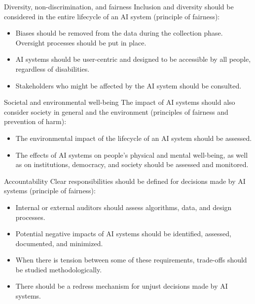 \begin{descriptionlist}
    \item[Diversity, non-discrimination, and fairness] 
        Inclusion and diversity should be considered in the entire lifecycle of an AI system (principle of fairness):
        \begin{itemize}
            \item Biases should be removed from the data during the collection phase. Oversight processes should be put in place.
            \item AI systems should be user-centric and designed to be accessible by all people, regardless of disabilities.
            \item Stakeholders who might be affected by the AI system should be consulted.
        \end{itemize}



    \item[Societal and environmental well-being] 
        The impact of AI systems should also consider society in general and the environment (principles of fairness and prevention of harm):
        \begin{itemize}
            \item The environmental impact of the lifecycle of an AI system should be assessed.
            \item The effects of AI systems on people's physical and mental well-being, as well as on institutions, democracy, and society should be assessed and monitored.
        \end{itemize}

    \item[Accountability] 
        Clear responsibilities should be defined for decisions made by AI systems (principle of fairness):
        \begin{itemize}
            \item Internal or external auditors should assess algorithms, data, and design processes.
            \item Potential negative impacts of AI systems should be identified, assessed, documented, and minimized.
            \item When there is tension between some of these requirements, trade-offs should be studied methodologically.
            \item There should be a redress mechanism for unjust decisions made by AI systems.
        \end{itemize}
\end{descriptionlist}

